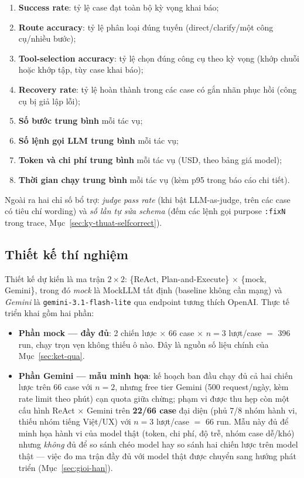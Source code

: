 \begin{enumerate}
  \item \textbf{Success rate}: tỷ lệ case đạt toàn bộ kỳ vọng khai báo;
  \item \textbf{Route accuracy}: tỷ lệ phân loại đúng tuyến
        (direct/clarify/một công cụ/nhiều bước);
  \item \textbf{Tool-selection accuracy}: tỷ lệ chọn đúng công cụ theo kỳ vọng
        (khớp chuỗi hoặc khớp tập, tùy case khai báo);
  \item \textbf{Recovery rate}: tỷ lệ hoàn thành trong các case có gắn nhãn
        phục hồi (công cụ bị giả lập lỗi);
  \item \textbf{Số bước trung bình} mỗi tác vụ;
  \item \textbf{Số lệnh gọi LLM trung bình} mỗi tác vụ;
  \item \textbf{Token và chi phí trung bình} mỗi tác vụ (USD, theo bảng giá
        model);
  \item \textbf{Thời gian chạy trung bình} mỗi tác vụ (kèm p95 trong báo cáo
        chi tiết).
\end{enumerate}

Ngoài ra hai chỉ số bổ trợ: \emph{judge pass rate} (khi bật LLM-as-judge,
trên các case có tiêu chí wording) và \emph{số lần tự sửa schema} (đếm các
lệnh gọi purpose \texttt{:fixN} trong trace,
Mục~\ref{sec:ky-thuat-selfcorrect}).

\subsection{Thiết kế thí nghiệm}

Thiết kế dự kiến là ma trận $2 \times 2$: \{ReAct, Plan-and-Execute\}
$\times$ \{mock, Gemini\}, trong đó \emph{mock} là MockLLM tất định
(baseline không cần mạng) và \emph{Gemini} là
\texttt{gemini-3.1-flash-lite} qua endpoint tương thích OpenAI. Thực tế
triển khai gồm hai phần:

\begin{itemize}
  \item \textbf{Phần mock --- đầy đủ}: 2 chiến lược $\times$ 66 case
        $\times$ $n = 3$ lượt/case $=$ 396 run, chạy trọn vẹn không thiếu ô
        nào. Đây là nguồn số liệu chính của Mục~\ref{sec:ket-qua}.
  \item \textbf{Phần Gemini --- mẫu minh họa}: kế hoạch ban đầu chạy đủ cả
        hai chiến lược trên 66 case với $n = 2$, nhưng free tier Gemini
        (500 request/ngày, kèm rate limit theo phút) cạn quota giữa chừng;
        phạm vi được thu hẹp còn một cấu hình ReAct $\times$ Gemini trên
        \textbf{22/66 case} đại diện (phủ 7/8 nhóm hành vi, thiếu nhóm
        tiếng Việt/UX) với $n = 3$ lượt/case $=$ 66 run. Mẫu này đủ để
        minh họa hành vi của model thật (token, chi phí, độ trễ, nhóm case
        dễ/khó) nhưng \emph{không} đủ để so sánh chéo model hay so sánh hai
        chiến lược trên model thật --- việc đo ma trận đầy đủ với model
        thật được chuyển sang hướng phát triển (Mục~\ref{sec:gioi-han}).
\end{itemize}

